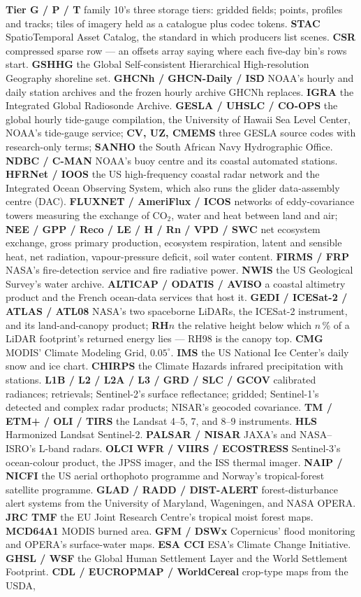 \documentclass[10pt]{article}
\begin{document}
\textbf{Tier G / P / T} family 10's three storage tiers: gridded fields; points, profiles and tracks; tiles of imagery held as a catalogue plus codec tokens. \textbf{STAC} SpatioTemporal Asset Catalog, the standard in which producers list scenes. \textbf{CSR} compressed sparse row --- an offsets array saying where each five-day bin's rows start. \textbf{GSHHG} the Global Self-consistent Hierarchical High-resolution Geography shoreline set. \textbf{GHCNh / GHCN-Daily / ISD} NOAA's hourly and daily station archives and the frozen hourly archive GHCNh replaces. \textbf{IGRA} the Integrated Global Radiosonde Archive. \textbf{GESLA / UHSLC / CO-OPS} the global hourly tide-gauge compilation, the University of Hawaii Sea Level Center, NOAA's tide-gauge service; \textbf{CV, UZ, CMEMS} three GESLA source codes with research-only terms; \textbf{SANHO} the South African Navy Hydrographic Office. \textbf{NDBC / C-MAN} NOAA's buoy centre and its coastal automated stations. \textbf{HFRNet / IOOS} the US high-frequency coastal radar network and the Integrated Ocean Observing System, which also runs the glider data-assembly centre (DAC). \textbf{FLUXNET / AmeriFlux / ICOS} networks of eddy-covariance towers measuring the exchange of CO$_2$, water and heat between land and air; \textbf{NEE / GPP / Reco / LE / H / Rn / VPD / SWC} net ecosystem exchange, gross primary production, ecosystem respiration, latent and sensible heat, net radiation, vapour-pressure deficit, soil water content. \textbf{FIRMS / FRP} NASA's fire-detection service and fire radiative power. \textbf{NWIS} the US Geological Survey's water archive. \textbf{ALTICAP / ODATIS / AVISO} a coastal altimetry product and the French ocean-data services that host it. \textbf{GEDI / ICESat-2 / ATLAS / ATL08} NASA's two spaceborne LiDARs, the ICESat-2 instrument, and its land-and-canopy product; \textbf{RH$n$} the relative height below which $n$\,\% of a LiDAR footprint's returned energy lies --- RH98 is the canopy top. \textbf{CMG} MODIS' Climate Modeling Grid, $0.05^\circ$. \textbf{IMS} the US National Ice Center's daily snow and ice chart. \textbf{CHIRPS} the Climate Hazards infrared precipitation with stations. \textbf{L1B / L2 / L2A / L3 / GRD / SLC / GCOV} calibrated radiances; retrievals; Sentinel-2's surface reflectance; gridded; Sentinel-1's detected and complex radar products; NISAR's geocoded covariance. \textbf{TM / ETM+ / OLI / TIRS} the Landsat 4--5, 7, and 8--9 instruments. \textbf{HLS} Harmonized Landsat Sentinel-2. \textbf{PALSAR / NISAR} JAXA's and NASA--ISRO's L-band radars. \textbf{OLCI WFR / VIIRS / ECOSTRESS} Sentinel-3's ocean-colour product, the JPSS imager, and the ISS thermal imager. \textbf{NAIP / NICFI} the US aerial orthophoto programme and Norway's tropical-forest satellite programme. \textbf{GLAD / RADD / DIST-ALERT} forest-disturbance alert systems from the University of Maryland, Wageningen, and NASA OPERA. \textbf{JRC TMF} the EU Joint Research Centre's tropical moist forest maps. \textbf{MCD64A1} MODIS burned area. \textbf{GFM / DSWx} Copernicus' flood monitoring and OPERA's surface-water maps. \textbf{ESA CCI} ESA's Climate Change Initiative. \textbf{GHSL / WSF} the Global Human Settlement Layer and the World Settlement Footprint. \textbf{CDL / EUCROPMAP / WorldCereal} crop-type maps from the USDA, 
\end{document}

